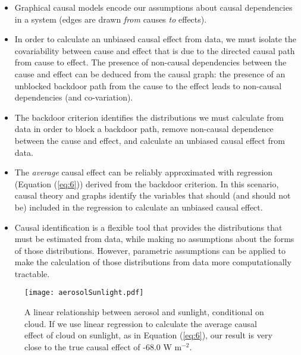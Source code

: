 \documentclass[12pt]{article}
\begin{document}
\begin{itemize}
\item Graphical causal models encode our assumptions about causal
  dependencies in a system (edges are drawn \emph{from} causes
  \emph{to} effects).
\item In order to calculate an unbiased causal effect from data, we
  must isolate the covariability between cause and effect that is due
  to the directed causal path from cause to effect. The presence of
  non-causal dependencies between the cause and effect can be deduced
  from the causal graph: the presence of an unblocked backdoor path
  from the cause to the effect leads to non-causal dependencies (and
  co-variation).
\item The backdoor criterion identifies the distributions we must
  calculate from data in order to block a backdoor path, remove
  non-causal dependence between the cause and effect, and calculate an
  unbiased causal effect from data.
\item The \emph{average} causal effect can be reliably approximated
  with regression (Equation (\ref{eq:6})) derived from the backdoor
  criterion. In this scenario, causal theory and graphs identify the
  variables that should (and should not be) included in the regression
  to calculate an unbiased causal effect.
\item Causal identification is a flexible tool that provides the
  distributions that must be estimated from data, while making no
  assumptions about the forms of those distributions. However,
  parametric assumptions can be applied to make the calculation of
  those distributions from data more computationally tractable.
\end{itemize}

\begin{figure}
  \texttt{[image: aerosolSunlight.pdf]}
  \caption{A linear relationship between aerosol and sunlight,
    conditional on cloud. If we use linear regression to calculate the
    average causal effect of cloud on sunlight, as in Equation
    (\ref{eq:6}), our result is very close to the true causal effect
    of -68.0 W m$^{-2}$.}
  \label{fig:linear}
\end{figure}
\end{document}

